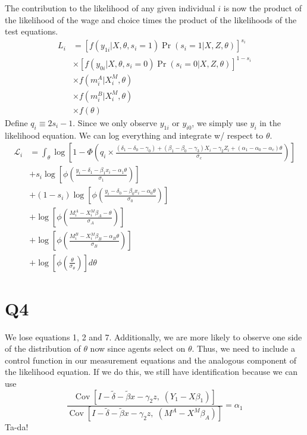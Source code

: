\documentclass[11pt,letterpaper]{article}
\DeclareMathOperator{\Cov}{Cov}
\begin{document}
The contribution to the likelihood of any given individual $i$ is now the product of the likelihood of the wage and choice times the product of the likelihoods of the test equations.
\begin{align*}
L_i &= 
	         \left[f(y_{1i}|X,\theta,s_i=1)\Pr(s_i=1|X,Z,\theta)\right]^{s_i} \\
	& \times \left[f(y_{0i}|X,\theta,s_i=0)\Pr(s_i=0|X,Z,\theta)\right]^{1-s_i} \\
	& \times f(m^A_i|X_i^M,\theta) \\
	& \times f(m^B_i|X_i^M,\theta) \\
	& \times f(\theta)
\end{align*}
Define $q_i \equiv 2s_i - 1$. Since we only observe $y_{1i}$ or $y_{i0}$, we simply use $y_i$ in the likelihood equation. We can log everything and integrate w/ respect to $\theta$. 
\begin{align*}
\mathcal L_i 
	&= \int_\theta \log \left[1 - \Phi\left(
		q_i \times \frac{(\delta_1 - \delta_0 - \gamma_0) + (\beta_1 - \beta_0 - \gamma_3)X_i - \gamma_2 Z_i + (\alpha_1 - \alpha_0 - \alpha_c)\theta}{\sigma_c} 
		\right) \right] \\
	&+    s_i  \log\left[\phi\left( \frac{y_i - \delta_1 - \beta_1 x_i - \alpha_1 \theta}{\sigma_1} \right) \right] \\
	&+ (1-s_i) \log\left[\phi\left( \frac{y_i - \delta_0 - \beta_0 x_i - \alpha_0 \theta}{\sigma_0} \right) \right] \\
	&+ \log\left[\phi\left(\frac{M_i^A - X^M_i\beta_A - \theta        }{\sigma_A} \right)\right] \\
	&+ \log\left[\phi\left(\frac{M_i^B - X^M_i\beta_B - \alpha_B\theta}{\sigma_B} \right)\right] \\
	&+ \log\left[\phi\left(\frac{\theta}{\sigma_\theta}\right)\right] d\theta
\end{align*}

\section{Q4}

We lose equations 1, 2 and 7. Additionally, we are more likely to observe one side of the distribution of $\theta$ now since agents select on $\theta$. Thus, we need to include a control function in our measurement equations and the analogous component of the likelihood equation. If we do this, we still have identification because we can use 
\[
\frac{\Cov\left[I - \widetilde \delta - \widetilde \beta x -\gamma_2 z,\; \left(Y_1 - X\beta_1 \right)\right]}
{\Cov\left[I - \widetilde \delta - \widetilde \beta x -\gamma_2 z,\; \left(M^A - X^M\beta_A \right)\right]} = \alpha_1
\]
Ta-da!
\end{document}
